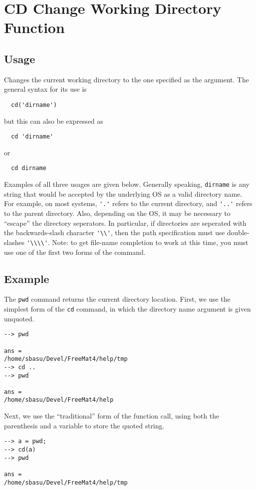 \section{CD Change Working Directory Function}

\subsection{Usage}

Changes the current working directory to the one specified as the argument.  The general syntax for its use is
\begin{verbatim}
  cd('dirname')
\end{verbatim}
but this can also be expressed as
\begin{verbatim}
  cd 'dirname'
\end{verbatim}
or 
\begin{verbatim}
  cd dirname
\end{verbatim}
Examples of all three usages are given below.
Generally speaking, \verb|dirname| is any string that would be accepted 
by the underlying OS as a valid directory name.  For example, on most 
systems, \verb|'.'| refers to the current directory, and \verb|'..'| refers 
to the parent directory.  Also, depending on the OS, it may be necessary 
to ``escape'' the directory seperators.  In particular, if directories 
are seperated with the backwards-slash character \verb|'\\'|, then the 
path specification must use double-slashes \verb|'\\\\'|. Note: to get 
file-name completion to work at this time, you must use one of the 
first two forms of the command.

\subsection{Example}

The \verb|pwd| command returns the current directory location.  First, 
we use the simplest form of the \verb|cd| command, in which the directory 
name argument is given unquoted.
\begin{verbatim}
--> pwd

ans = 
/home/sbasu/Devel/FreeMat4/help/tmp
--> cd ..
--> pwd

ans = 
/home/sbasu/Devel/FreeMat4/help
\end{verbatim}
Next, we use the ``traditional'' form of the function call, using 
both the parenthesis and a variable to store the quoted string.
\begin{verbatim}
--> a = pwd;
--> cd(a)
--> pwd

ans = 
/home/sbasu/Devel/FreeMat4/help/tmp
\end{verbatim}
